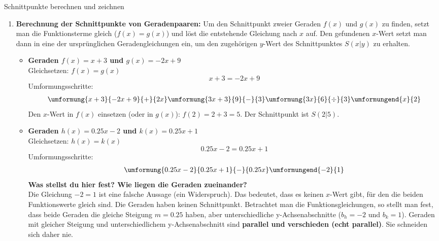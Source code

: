 \begin{loesungsumgebung}{Schnittpunkte berechnen und zeichnen}

\begin{enumerate}
    \item \textbf{Berechnung der Schnittpunkte von Geradenpaaren:}
    Um den Schnittpunkt zweier Geraden $f(x)$ und $g(x)$ zu finden, setzt man die Funktionsterme gleich ($f(x)=g(x)$) und löst die entstehende Gleichung nach $x$ auf. Den gefundenen $x$-Wert setzt man dann in eine der ursprünglichen Geradengleichungen ein, um den zugehörigen $y$-Wert des Schnittpunktes $S(x|y)$ zu erhalten.

    \begin{itemize}
        \item \textbf{Geraden $f(x) = x + 3$ und $g(x) = -2x + 9$} \\
        Gleichsetzen: $f(x) = g(x)$
        $$ x + 3 = -2x + 9 $$
        Umformungsschritte:
        $$
        \begin{array}{r c l c l}
        \umformung{x+3}{-2x+9}{+}{2x}
        \umformung{3x+3}{9}{-}{3}
        \umformung{3x}{6}{\div}{3}
        \umformungend{x}{2}
        \end{array}
        $$
        Den $x$-Wert in $f(x)$ einsetzen (oder in $g(x)$):
        $f(2) = 2 + 3 = 5$.
        Der Schnittpunkt ist $S(2|5)$.

        \item \textbf{Geraden $h(x) = 0.25x - 2$ und $k(x) = 0.25x + 1$} \\
        Gleichsetzen: $h(x) = k(x)$
        $$ 0.25x - 2 = 0.25x + 1 $$
        Umformungsschritte:
        $$
        \begin{array}{r c l c l}
        \umformung{0.25x - 2}{0.25x + 1}{-}{0.25x}
        \umformungend{-2}{1} %
        \end{array}
        $$
        \textbf{Was stellst du hier fest? Wie liegen die Geraden zueinander?} \\
        Die Gleichung $-2 = 1$ ist eine falsche Aussage (ein Widerspruch). Das bedeutet, dass es keinen $x$-Wert gibt, für den die beiden Funktionswerte gleich sind. Die Geraden haben keinen Schnittpunkt.
        Betrachtet man die Funktionsgleichungen, so stellt man fest, dass beide Geraden die gleiche Steigung $m=0.25$ haben, aber unterschiedliche y-Achsenabschnitte ($b_h = -2$ und $b_k = 1$). Geraden mit gleicher Steigung und unterschiedlichem y-Achsenabschnitt sind \textbf{parallel und verschieden (echt parallel)}. Sie schneiden sich daher nie.


\end{itemize}
\end{enumerate}
\end{loesungsumgebung}
